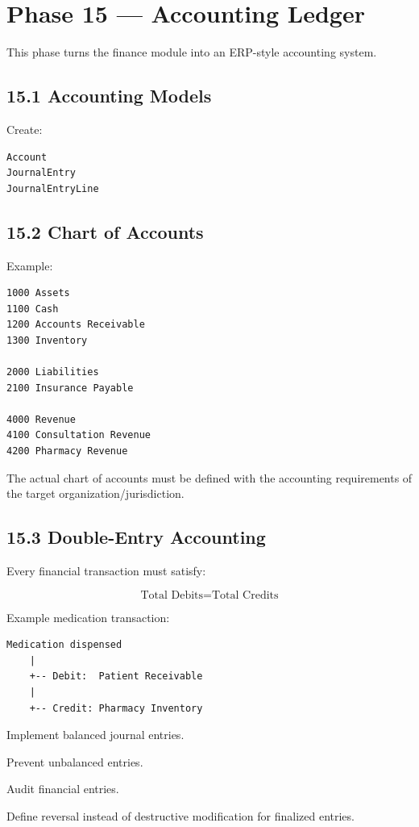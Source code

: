 \documentclass[11pt,a4paper]{article}
\newcommand{\task}[1]{\item[$\square$] #1}
\begin{document}
\section{Phase 15 --- Accounting Ledger}

This phase turns the finance module into an ERP-style accounting system.

\subsection{15.1 Accounting Models}

Create:

\begin{lstlisting}
Account
JournalEntry
JournalEntryLine
\end{lstlisting}

\subsection{15.2 Chart of Accounts}

Example:

\begin{lstlisting}
1000 Assets
1100 Cash
1200 Accounts Receivable
1300 Inventory

2000 Liabilities
2100 Insurance Payable

4000 Revenue
4100 Consultation Revenue
4200 Pharmacy Revenue
\end{lstlisting}

The actual chart of accounts must be defined with the accounting
requirements of the target organization/jurisdiction.

\subsection{15.3 Double-Entry Accounting}

Every financial transaction must satisfy:

\[
\text{Total Debits} = \text{Total Credits}
\]

Example medication transaction:

\begin{lstlisting}
Medication dispensed
    |
    +-- Debit:  Patient Receivable
    |
    +-- Credit: Pharmacy Inventory
\end{lstlisting}

\task{Implement balanced journal entries.}
\task{Prevent unbalanced entries.}
\task{Audit financial entries.}
\task{Define reversal instead of destructive modification for finalized entries.}
\end{document}
